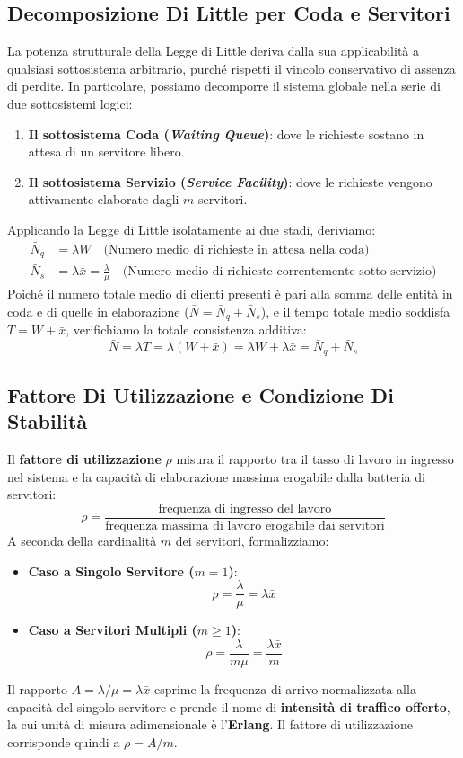 \documentclass[11pt, a4paper]{article}
\begin{document}
\subsection{Decomposizione Di Little per Coda e Servitori}

La potenza strutturale della Legge di Little deriva dalla sua applicabilità a qualsiasi sottosistema arbitrario, purché rispetti il vincolo conservativo di assenza di perdite. In particolare, possiamo decomporre il sistema globale nella serie di due sottosistemi logici:
\begin{enumerate}
    \item \textbf{Il sottosistema Coda (\emph{Waiting Queue})}: dove le richieste sostano in attesa di un servitore libero.
    \item \textbf{Il sottosistema Servizio (\emph{Service Facility})}: dove le richieste vengono attivamente elaborate dagli $m$ servitori.
\end{enumerate}

Applicando la Legge di Little isolatamente ai due stadi, deriviamo:
\begin{align*}
    \bar{N}_q &= \lambda W \quad \text{(Numero medio di richieste in attesa nella coda)} \\
    \bar{N}_s &= \lambda \bar{x} = \frac{\lambda}{\mu} \quad \text{(Numero medio di richieste correntemente sotto servizio)}
\end{align*}
Poiché il numero totale medio di clienti presenti è pari alla somma delle entità in coda e di quelle in elaborazione ($\bar{N} = \bar{N}_q + \bar{N}_s$), e il tempo totale medio soddisfa $T = W + \bar{x}$, verifichiamo la totale consistenza additiva:
\[
    \boxed{\bar{N} = \lambda T = \lambda (W + \bar{x}) = \lambda W + \lambda \bar{x} = \bar{N}_q + \bar{N}_s}
\]

\subsection{Fattore Di Utilizzazione e Condizione Di Stabilit\`a}

Il \textbf{fattore di utilizzazione} $\rho$ misura il rapporto tra il tasso di lavoro in ingresso nel sistema e la capacità di elaborazione massima erogabile dalla batteria di servitori:
\[
    \rho = \frac{\text{frequenza di ingresso del lavoro}}{\text{frequenza massima di lavoro erogabile dai servitori}}
\]
A seconda della cardinalità $m$ dei servitori, formalizziamo:
\begin{itemize}[leftmargin=*]
    \item \textbf{Caso a Singolo Servitore ($m = 1$)}:
    \[
        \boxed{\rho = \frac{\lambda}{\mu} = \lambda \bar{x}}
    \]
    \item \textbf{Caso a Servitori Multipli ($m \ge 1$)}:
    \[
        \boxed{\rho = \frac{\lambda}{m \mu} = \frac{\lambda \bar{x}}{m}}
    \]
\end{itemize}
Il rapporto $A = \lambda / \mu = \lambda \bar{x}$ esprime la frequenza di arrivo normalizzata alla capacità del singolo servitore e prende il nome di \textbf{intensità di traffico offerto}, la cui unità di misura adimensionale è l'\textbf{Erlang}. Il fattore di utilizzazione corrisponde quindi a $\rho = A / m$.
\end{document}
